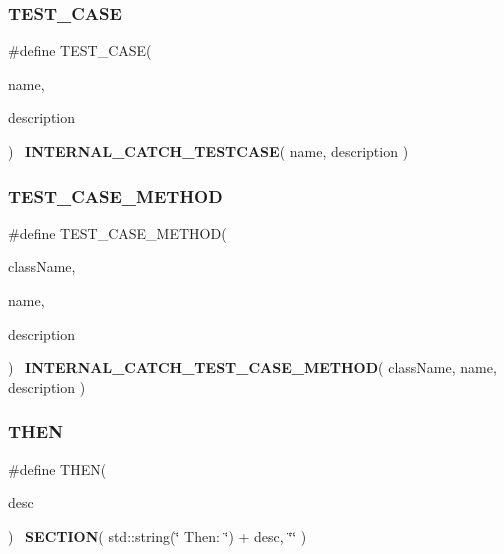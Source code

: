 \mbox{\label{catch_8hpp_a4306f112aa064372e584f2af283f24e9}} 
\subsubsection{T\+E\+S\+T\+\_\+\+C\+A\+SE}
{\footnotesize\ttfamily \#define T\+E\+S\+T\+\_\+\+C\+A\+SE(\begin{DoxyParamCaption}\item[{}]{name,  }\item[{}]{description }\end{DoxyParamCaption})~\textbf{ I\+N\+T\+E\+R\+N\+A\+L\+\_\+\+C\+A\+T\+C\+H\+\_\+\+T\+E\+S\+T\+C\+A\+SE}( name, description )}

\mbox{\label{catch_8hpp_a883fb6fc28b7dbda0fcefb2dd626546f}} 
\subsubsection{T\+E\+S\+T\+\_\+\+C\+A\+S\+E\+\_\+\+M\+E\+T\+H\+OD}
{\footnotesize\ttfamily \#define T\+E\+S\+T\+\_\+\+C\+A\+S\+E\+\_\+\+M\+E\+T\+H\+OD(\begin{DoxyParamCaption}\item[{}]{class\+Name,  }\item[{}]{name,  }\item[{}]{description }\end{DoxyParamCaption})~\textbf{ I\+N\+T\+E\+R\+N\+A\+L\+\_\+\+C\+A\+T\+C\+H\+\_\+\+T\+E\+S\+T\+\_\+\+C\+A\+S\+E\+\_\+\+M\+E\+T\+H\+OD}( class\+Name, name, description )}

\mbox{\label{catch_8hpp_a27987092139727fd7a471b5f74dc62de}} 
\subsubsection{T\+H\+EN}
{\footnotesize\ttfamily \#define T\+H\+EN(\begin{DoxyParamCaption}\item[{}]{desc }\end{DoxyParamCaption})~\textbf{ S\+E\+C\+T\+I\+ON}( std\+::string(\char`\"{}    Then\+: \char`\"{}) + desc, \char`\"{}\char`\"{} )}

